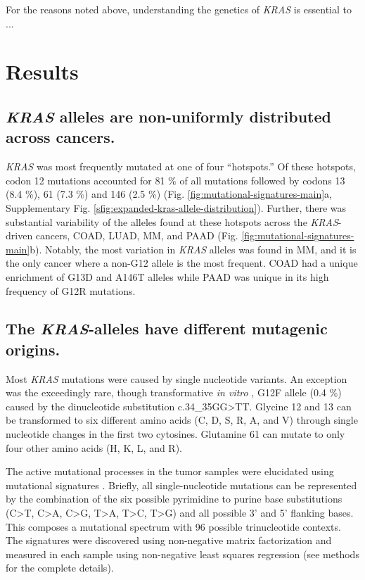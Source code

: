 \documentclass[english, 12pt, letterpaper]{article}
\newcommand{\KRAS}{\emph{KRAS}}
\begin{document}
For the reasons noted above, understanding the genetics of \KRAS{} is essential to ...

\section*{Results}

\subsection*{\KRAS{} alleles are non-uniformly distributed across cancers.}

\KRAS{} was most frequently mutated at one of four “hotspots.” 
Of these hotspots, codon 12 mutations accounted for 81 \% of all mutations followed by codons 13 (8.4 \%), 61 (7.3 \%) and 146 (2.5 \%) (Fig. \ref{fig:mutational-signatures-main}a, Supplementary Fig. \ref{sfig:expanded-kras-allele-distribution}). 
Further, there was substantial variability of the alleles found at these hotspots across the \KRAS{}-driven cancers, COAD, LUAD, MM, and PAAD (Fig. \ref{fig:mutational-signatures-main}b). 
Notably, the most variation in \KRAS{} alleles was found in MM, and it is the only cancer where a non-G12 allele is the most frequent. 
COAD had a unique enrichment of G13D and A146T alleles while PAAD was unique in its high frequency of G12R mutations.


\subsection*{The \KRAS{}-alleles have different mutagenic origins.}

Most \KRAS{} mutations were caused by single nucleotide variants.
An exception was the exceedingly rare, though transformative \emph{in vitro} \cite{Barbacid1987}, G12F allele (0.4 \%) caused by the dinucleotide substitution c.34\_35GG>TT. Glycine 12 and 13 can be transformed to six different amino acids (C, D, S, R, A, and V) through single nucleotide changes in the first two cytosines.
Glutamine 61 can mutate to only four other amino acids (H, K, L, and R).

The active mutational processes in the tumor samples were elucidated using mutational signatures \cite{Alexandrov2013}. 
Briefly, all single-nucleotide mutations can be represented by the combination of the six possible pyrimidine to purine base substitutions (C>T, C>A, C>G, T>A, T>C, T>G) and all possible 3’ and 5’ flanking bases. 
This composes a mutational spectrum with 96 possible trinucleotide contexts. 
The signatures were discovered using non-negative matrix factorization and measured in each sample using non-negative least squares regression (see methods for the complete details). 
\end{document}
